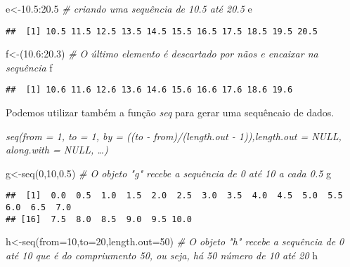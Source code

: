 \documentclass[
]{book}
\newenvironment{Shaded}{\begin{snugshade}}{\end{snugshade}}
\newcommand{\AttributeTok}[1]{\textcolor[rgb]{0.77,0.63,0.00}{#1}}
\newcommand{\CommentTok}[1]{\textcolor[rgb]{0.56,0.35,0.01}{\textit{#1}}}
\newcommand{\DecValTok}[1]{\textcolor[rgb]{0.00,0.00,0.81}{#1}}
\newcommand{\FloatTok}[1]{\textcolor[rgb]{0.00,0.00,0.81}{#1}}
\newcommand{\FunctionTok}[1]{\textcolor[rgb]{0.00,0.00,0.00}{#1}}
\newcommand{\NormalTok}[1]{#1}
\newcommand{\OtherTok}[1]{\textcolor[rgb]{0.56,0.35,0.01}{#1}}
\newcommand{\SpecialCharTok}[1]{\textcolor[rgb]{0.00,0.00,0.00}{#1}}
\begin{document}
\begin{Shaded}
\begin{Highlighting}[]
\NormalTok{e}\OtherTok{\textless{}{-}}\FloatTok{10.5}\SpecialCharTok{:}\FloatTok{20.5} \CommentTok{\# criando uma sequência de 10.5 até 20.5}
\NormalTok{e}
\end{Highlighting}
\end{Shaded}

\begin{verbatim}
##  [1] 10.5 11.5 12.5 13.5 14.5 15.5 16.5 17.5 18.5 19.5 20.5
\end{verbatim}

\begin{Shaded}
\begin{Highlighting}[]
\NormalTok{f}\OtherTok{\textless{}{-}}\NormalTok{(}\FloatTok{10.6}\SpecialCharTok{:}\FloatTok{20.3}\NormalTok{) }\CommentTok{\# O último elemento é descartado por nãos e encaixar na sequência}
\NormalTok{f}
\end{Highlighting}
\end{Shaded}

\begin{verbatim}
##  [1] 10.6 11.6 12.6 13.6 14.6 15.6 16.6 17.6 18.6 19.6
\end{verbatim}

Podemos utilizar também a função \emph{seq} para gerar uma sequêncaio de dados.

\emph{\emph{seq(from = 1, to = 1, by = ((to - from)/(length.out - 1)),length.out = NULL, along.with = NULL, \ldots)}}

\begin{Shaded}
\begin{Highlighting}[]
\NormalTok{g}\OtherTok{\textless{}{-}}\FunctionTok{seq}\NormalTok{(}\DecValTok{0}\NormalTok{,}\DecValTok{10}\NormalTok{,}\FloatTok{0.5}\NormalTok{) }\CommentTok{\# O objeto "g" recebe a sequência de 0 até 10 a cada 0.5}
\NormalTok{g}
\end{Highlighting}
\end{Shaded}

\begin{verbatim}
##  [1]  0.0  0.5  1.0  1.5  2.0  2.5  3.0  3.5  4.0  4.5  5.0  5.5  6.0  6.5  7.0
## [16]  7.5  8.0  8.5  9.0  9.5 10.0
\end{verbatim}

\begin{Shaded}
\begin{Highlighting}[]
\NormalTok{h}\OtherTok{\textless{}{-}}\FunctionTok{seq}\NormalTok{(}\AttributeTok{from=}\DecValTok{10}\NormalTok{,}\AttributeTok{to=}\DecValTok{20}\NormalTok{,}\AttributeTok{length.out=}\DecValTok{50}\NormalTok{) }\CommentTok{\# O objeto "h" recebe a sequência de 0 até 10 que é do compriumento 50, ou seja, há 50 número de 10 até 20}
\NormalTok{h}
\end{Highlighting}
\end{Shaded}
\end{document}
